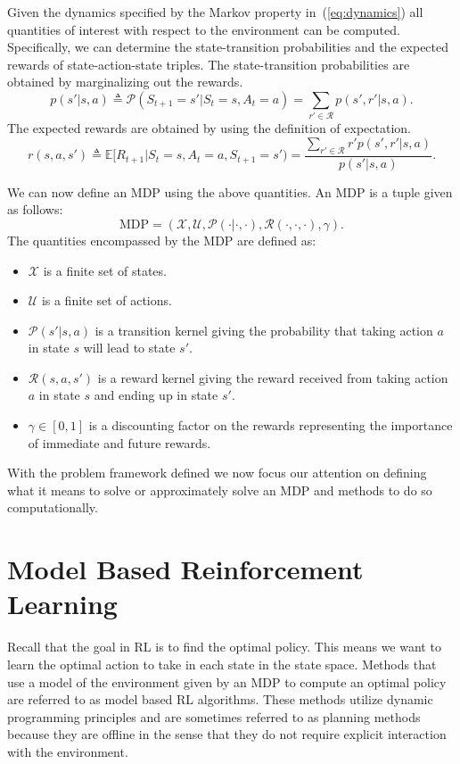 \documentclass{article}
\newcommand{\mc}{\mathcal}
\newcommand{\mb}{\mathbb}
\begin{document}
Given the dynamics specified by the Markov property in~(\ref{eq:dynamics}) all quantities of interest with respect to the environment can be computed. Specifically, we can determine the state-transition probabilities and the expected rewards of state-action-state triples. The state-transition probabilities are obtained by marginalizing out the rewards.
\begin{equation}
p(s'|s, a) \triangleq \mc{P}(S_{t+1}=s'|S_t=s, A_t=a) = \sum_{r' \in \mc{R}} p(s', r'|s, a).
\end{equation}
The expected rewards are obtained by using the definition of expectation.
\begin{equation}
r(s,a,s') \triangleq \mb{E}[R_{t+1}|S_t=s, A_t=a, S_{t+1}=s') = \frac{\sum_{r' \in \mc{R}} r'p(s', r'|s, a)}{p(s'|s,a)}.
\end{equation}

We can now define an MDP using the above quantities. An MDP is a tuple given as follows:
\begin{equation}
\text{MDP} = (\mc{X}, \mc{U}, \mc{P}(\cdot|\cdot, \cdot), \mc{R}(\cdot, \cdot, \cdot), \gamma).
\end{equation}
The quantities encompassed by the MDP are defined as:
\begin{itemize}
\item $\mc{X}$ is a finite set of states.
\item $\mc{U}$ is a finite set of actions.
\item $\mc{P}(s'|s, a)$ is a transition kernel giving the probability that taking action $a$ in state $s$ will lead to state $s'$.
\item $\mc{R}(s, a, s')$ is a reward kernel giving the reward received from taking action $a$ in state $s$ and ending up in state $s'$.
\item $\gamma \in [0, 1]$ is a discounting factor on the rewards representing the importance of immediate and future rewards.
\end{itemize}
With the problem framework defined we now focus our attention on defining what it means to solve or approximately solve an MDP and methods to do so computationally.

\section{Model Based Reinforcement Learning}\label{sec:model_based}
Recall that the goal in RL is to find the optimal policy. This means we want to learn the optimal action to take in each state in the state space. Methods that use a model of the environment given by an MDP to compute an optimal policy are referred to as model based RL algorithms. These methods utilize dynamic programming principles and are sometimes referred to as planning methods because they are offline in the sense that they do not require explicit interaction with the environment.
\end{document}
